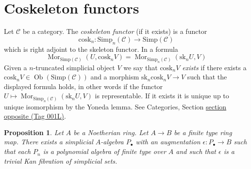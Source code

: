 \documentclass{amsart}
\theoremstyle{plain}
\newtheorem{proposition}[subsection]{Proposition}
\theoremstyle{definition}
\theoremstyle{remark}
\numberwithin{equation}{subsection}
\def\Mor{\mathop{\mathrm{Mor}}\nolimits}
\def\Ob{\mathop{\mathrm{Ob}}\nolimits}
\begin{document}
\section{Coskeleton functors}
\label{simplicial-section-coskeleton}

\noindent
Let $\mathcal{C}$ be a category.
The {\it coskeleton functor} (if it exists) is a functor
$$
\text{cosk}_n :
\text{Simp}_n(\mathcal{C}) \longrightarrow \text{Simp}(\mathcal{C})
$$
which is right adjoint to the skeleton functor. In a formula
\begin{equation}
\label{simplicial-equation-cosk}
\Mor_{\text{Simp}(\mathcal{C})}(U, \text{cosk}_n V)
=
\Mor_{\text{Simp}_n(\mathcal{C})}(\text{sk}_n U, V)
\end{equation}
Given a $n$-truncated simplicial object $V$ we
say that {\it $\text{cosk}_nV$ exists} if there
exists a $\text{cosk}_nV \in \Ob(\text{Simp}(\mathcal{C}))$
and a morphism $\text{sk}_n \text{cosk}_n V \to V$
such that the displayed formula holds, in other words
if the functor
$U \mapsto \Mor_{\text{Simp}_n(\mathcal{C})}(\text{sk}_n U, V)$
is representable. If it exists it
is unique up to unique isomorphism by the Yoneda lemma.
See Categories, Section \href{https://stacks.math.columbia.edu/tag/001L}{section opposite (Tag 001L)}.



\begin{proposition}
\label{proposition-polynomial}
Let $A$ be a Noetherian ring. Let $A \to B$ be a finite type ring map.
There exists a simplicial $A$-algebra $P_\bullet$ with an augmentation
$\epsilon : P_\bullet \to B$ such that each $P_n$ is a polynomial algebra
of finite type over $A$ and such that $\epsilon$ is a trivial
Kan fibration of simplicial sets.
\end{proposition}
\end{document}
